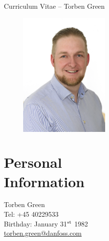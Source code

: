 \documentclass[margin,line,a4paper]{resume}
\begin{document}
{\sc \Large Curriculum Vitae -- Torben Green}
\begin{resume}
    \vspace{0.5cm}
    \begin{figure}
      \vspace{-1cm}
      \begin{center}
        \includegraphics[width=0.4\textwidth]{TOG_visitkort}
      \end{center}
      \vspace{-1cm}
    \end{figure}

    \section{\mysidestyle Personal\\Information}%
    Torben Green \\
    Tel: +45 40229533  \\
    Birthday: January 31$^{\rm st}$ 1982\\
    \href{mailto:torben.green@danfoss.com}{torben.green@danfoss.com} \\


\end{resume}
\end{document}
